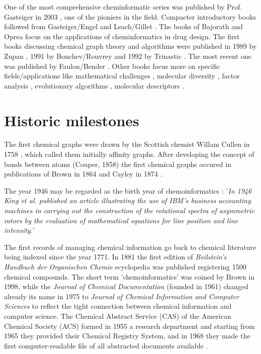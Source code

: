 \documentclass{sig-alternate}
\begin{document}
One of the most comprehensive cheminformatic series was published by Prof. Gasteiger in 2003 \cite{Gasteiger2003}, one of the pioniers in the field.
Compacter introductory books followed from Gasteiger/Engel \cite{gasteigerengel2003} and Leach/Gillet \cite{leachgillet2007}.
The books of Bajorath \cite{Bajorath2004} and Oprea \cite{oprea2005} focus on the applications of cheminformatics in drug design.
The first books discussing chemical graph theory and algorithms were published in 1989 by Zupan \cite{zupan1989}, 
1991 by Bonchev/Rouvrey \cite{bonchevrouvrey1991,bonchevrouvrey2003} and 1992 by Trinastic \cite{Trinajstic1992}. 
The most recent one was published by Faulon/Bender \cite{faulon2010}.
Other books focus more on specific fields/applications like mathematical challenges \cite{mathchallenges1995}, 
molecular diversity \cite{moleculardiversity1999}, factor analysis \cite{Malinowski2002}, evolutionary algorithms \cite{clark2000},
molecular descriptors \cite{todeschini2000}.

\section{Historic milestones}
The first chemical graphs were drawn by the Scottish chemist Willam Cullen in 1758 \cite{bonchevrouvrey1991}, which called them initially affinity graphs.
After developing the concept of bonds between atoms (Couper, 1858) the first chemical graphs occured in publications 
of Brown in 1864 and Cayley in 1874 \cite{bonchevrouvrey1991,brown2009}. 

The year 1946 may be regarded as the birth year of chemoinformatics \cite{Chen2006}: '\textit{In 1946 King et al.\cite{kct1946} published an article illustrating 
the use of IBM's business accounting machines in carrying out the construction of the rotational spectra of asymmetric rotors
by the evaluation of mathematical equations for line position and line intensity.}'

The first records of managing chemical information go back to chemical literature being indexed since the year 1771.
In 1881 the first edition of \textit{Beilstein's Handbuch der Organischen Chemie} ecyclopedia was 
published \cite{polanski2009} registering 1500 chemical compounds. The short term 'chemoinformatics' was coined by Brown 
in 1998\cite{brown1998}, while the \textit{Journal of Chemical Documentation} (founded in 1961) changed already its name in 1975 to 
\textit{Journal of Chemical Information and Computer Sciences} to reflect the tight connection between chemical information 
and computer science. The Chemical Abstract Service (CAS) of the American Chemical Society (ACS) formed in 1955 a research department
and starting from 1965 they provided their Chemical Registry System, and in 1968 they made the first computer-readable file of all
abstracted documents available \cite{Chen2006}.
\end{document}
